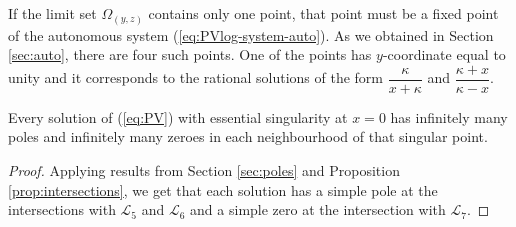 \begin{remark}
If the limit set $\Omega_{(y,z)}$ contains only one point, that point must be a fixed point of the autonomous system (\ref{eq:PVlog-system-auto}).
As we obtained in Section \ref{sec:auto}, there are four such points.
One of the points has $y$-coordinate equal to unity and it corresponds to the rational solutions of the form $\dfrac{\kappa}{x+\kappa}$ and $\dfrac{\kappa+x}{\kappa-x}$.
\end{remark}

\begin{theorem}\label{th:zeroespoles}
Every solution of (\ref{eq:PV}) with essential singularity at $x=0$ has infinitely many poles and infinitely many zeroes in each neighbourhood of that singular point.
\end{theorem}

\begin{proof}
Applying results from Section \ref{sec:poles} and Proposition \ref{prop:intersections}, we get that each solution has a simple pole at the intersections with $\mathcal{L}_5$ and $\mathcal{L}_6$ and a simple zero at the intersection with $\mathcal{L}_7$.
\end{proof}
